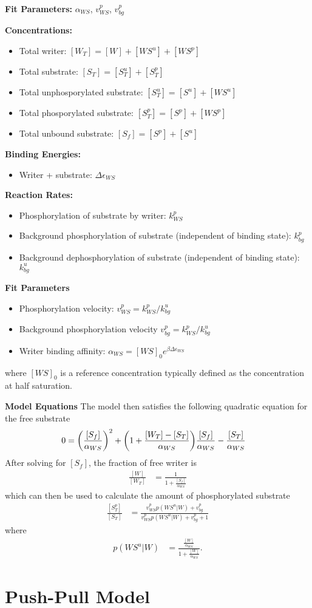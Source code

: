 \documentclass[aps,onecolumn,superscriptaddress,notitlepage]{revtex4-1}
\begin{document}
\textbf{Fit Parameters:} $\alpha_{WS}$, $v_{WS}^p$, $v_{bg}^p$


\textbf{Concentrations:}
\begin{itemize}
\item Total writer: $[W_T] = [W] + [WS^u] + [WS^p]$
\item Total substrate: $[S_T] = [S^u_T] + [S^p_T]$
\item Total unphosporylated substrate: $[S^u_T] = [S^u] + [WS^u]$
\item Total phosporylated substrate: $[S^p_T] = [S^p] + [WS^p]$
\item Total unbound substrate: $[S_f] = [S^p] + [S^u]$
\end{itemize}

\textbf{Binding Energies:}
\begin{itemize}
\item Writer + substrate: $\Delta\epsilon_{WS}$
\end{itemize}

\textbf{Reaction Rates:}
\begin{itemize}
\item Phosphorylation of substrate by writer: $k_{WS}^p$
\item Background phosphorylation of substrate (independent of binding state): $k_{bg}^p$
\item Background dephosphorylation of substrate (independent of binding state): $k_{bg}^u$
\end{itemize}

\textbf{Fit Parameters}
\begin{itemize}
\item Phosphorylation velocity: $v_{WS}^p = k_{WS}^p/k_{bg}^u$
\item Background phosphorylation velocity  $v_{bg}^p = k_{WS}^p/k_{bg}^u$
\item Writer binding affinity: $\alpha_{WS} = [WS]_0e^{\beta \Delta\epsilon_{WS}}$
\end{itemize}
where $[WS]_0$ is a reference concentration typically defined as the concentration at half saturation.

\textbf{Model Equations}
The model then satisfies the following quadratic equation for the free substrate
\begin{align}
0 &= \qty(\frac{[S_f]}{\alpha_{WS}})^2 +  \qty(1+\frac{[W_T]-[S_T]}{\alpha_{WS}})\frac{[S_f]}{\alpha_{WS}} - \frac{[S_T]}{\alpha_{WS}}
\end{align}
After solving for $[S_f]$, the fraction of free writer is
\begin{align}
\frac{[W]}{[W_T]} & = \frac{1}{1 + \frac{[S_f]}{\alpha_{WS}}}
\end{align}
which can then be used to calculate the amount of phosphorylated substrate
\begin{align}
\frac{[S_T^p]}{[S_T]} &= \frac{v_{WS}^p p(WS^u|W) + v_{bg}^p}{v_{WS}^p p(WS^u|W) + v_{bg}^p+1}
\end{align}
where 
\begin{align}
p(WS^u|W) &= \frac{\frac{[W]}{\alpha_{WS}}}{1 + \frac{[W]}{\alpha_{WS}}}.
\end{align}


\section{Push-Pull Model}
\end{document}
